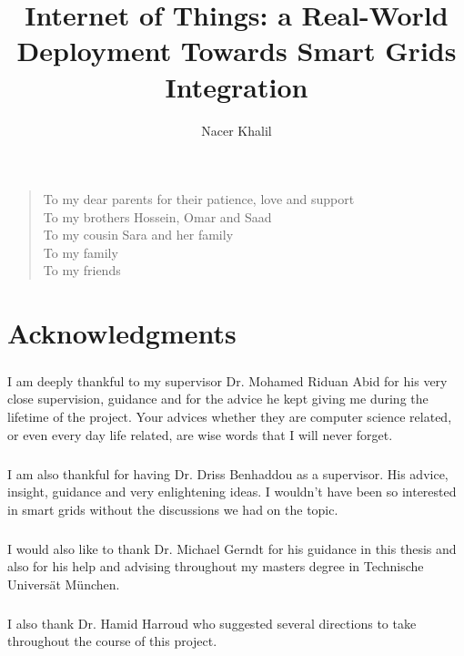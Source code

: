 \documentclass[12pt,a4paper,final]{report}
\author{Nacer Khalil}
\title{Internet of Things: a Real-World Deployment Towards Smart Grids Integration}
\newenvironment{dedication}{\vspace{6ex}\begin{quotation}\begin{center}\begin{em}}{\par\end{em}\end{center}\end{quotation}}
\begin{document}
\doublespacing



\chapter*{} %
\begin{dedication}
To my dear parents for their patience, love and support \\
To my brothers Hossein, Omar and Saad \\
To my cousin Sara and her family \\
To my family \\
To my friends \\
\end{dedication}

\pagestyle{headings}
\setcounter{page}{1}

\chapter*{Acknowledgments}
\paragraph{}
I am deeply thankful to my supervisor Dr. Mohamed Riduan Abid for his very close supervision, guidance and for the advice he kept giving me during the lifetime of the project. Your advices whether they are computer science related, or even every day life related, are wise words that I will never forget.
\paragraph{}
I am also thankful for having Dr. Driss Benhaddou as a supervisor. His advice, insight, guidance and very enlightening ideas. I wouldn't have been so interested in smart grids without the discussions we had on the topic.
\paragraph{}
I would also like to thank Dr. Michael Gerndt for his guidance in this thesis and also for his help and advising throughout my masters degree in Technische Universät München.
\paragraph{}
I  also thank Dr. Hamid Harroud who suggested several directions to take throughout the course of this project.
\end{document}
